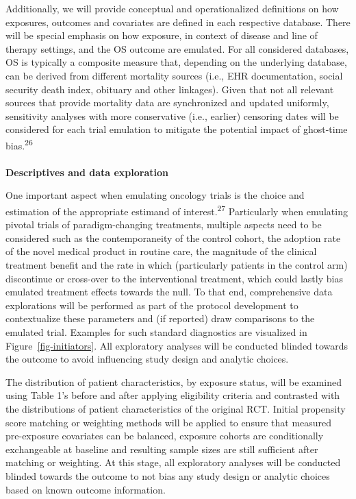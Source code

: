 \documentclass[
  letterpaper,
  DIV=11,
  numbers=noendperiod]{scrartcl}
\makeatletter
\let\oldparagraph\paragraph
\renewcommand{\paragraph}{
    \@ifstar
      \xxxParagraphStar
      \xxxParagraphNoStar
  }
\newcommand{\xxxParagraphStar}[1]{\oldparagraph*{#1}\mbox{}}
\newcommand{\xxxParagraphNoStar}[1]{\oldparagraph{#1}\mbox{}}
\makeatother
\begin{document}
Additionally, we will provide conceptual and operationalized definitions
on how exposures, outcomes and covariates are defined in each respective
database. There will be special emphasis on how exposure, in context of
disease and line of therapy settings, and the OS outcome are emulated.
For all considered databases, OS is typically a composite measure that,
depending on the underlying database, can be derived from different
mortality sources (i.e., EHR documentation, social security death index,
obituary and other linkages). Given that not all relevant sources that
provide mortality data are synchronized and updated uniformly,
sensitivity analyses with more conservative (i.e., earlier) censoring
dates will be considered for each trial emulation to mitigate the
potential impact of ghost-time bias.\textsuperscript{26}

\paragraph{\texorpdfstring{\textbf{Descriptives and data
exploration}}{Descriptives and data exploration}}\label{descriptives-and-data-exploration}

One important aspect when emulating oncology trials is the choice and
estimation of the appropriate estimand of interest.\textsuperscript{27}
Particularly when emulating pivotal trials of paradigm-changing
treatments, multiple aspects need to be considered such as the
contemporaneity of the control cohort, the adoption rate of the novel
medical product in routine care, the magnitude of the clinical treatment
benefit and the rate in which (particularly patients in the control arm)
discontinue or cross-over to the interventional treatment, which could
lastly bias emulated treatment effects towards the null. To that end,
comprehensive data explorations will be performed as part of the
protocol development to contextualize these parameters and (if reported)
draw comparisons to the emulated trial. Examples for such standard
diagnostics are visualized in Figure~\ref{fig-initiators}. All
exploratory analyses will be conducted blinded towards the outcome to
avoid influencing study design and analytic choices.

The distribution of patient characteristics, by exposure status, will be
examined using Table 1's before and after applying eligibility criteria
and contrasted with the distributions of patient characteristics of the
original RCT. Initial propensity score matching or weighting methods
will be applied to ensure that measured pre-exposure covariates can be
balanced, exposure cohorts are conditionally exchangeable at baseline
and resulting sample sizes are still sufficient after matching or
weighting. At this stage, all exploratory analyses will be conducted
blinded towards the outcome to not bias any study design or analytic
choices based on known outcome information.
\end{document}
